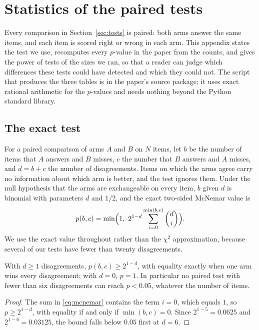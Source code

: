 \section{Statistics of the paired tests}\label{app:stats}

Every comparison in Section~\ref{sec:tests} is paired: both arms answer the same items, and each item is scored right or wrong in each arm. This appendix states the test we use, recomputes every $p$-value in the paper from the counts, and gives the power of tests of the sizes we ran, so that a reader can judge which differences these tests could have detected and which they could not. The script that produces the three tables is in the paper's source package; it uses exact rational arithmetic for the $p$-values and needs nothing beyond the Python standard library.

\subsection{The exact test}
For a paired comparison of arms $A$ and $B$ on $N$ items, let $b$ be the number of items that $A$ answers and $B$ misses, $c$ the number that $B$ answers and $A$ misses, and $d=b+c$ the number of disagreements. Items on which the arms agree carry no information about which arm is better, and the test ignores them. Under the null hypothesis that the arms are exchangeable on every item, $b$ given $d$ is binomial with parameters $d$ and $1/2$, and the exact two-sided McNemar value \cite{McNemar1947} is
\begin{equation}\label{eq:mcnemar}
p(b,c)=\min\Bigl(1,\ 2^{1-d}\sum_{i=0}^{\min(b,c)}\binom{d}{i}\Bigr).
\end{equation}
We use the exact value throughout rather than the $\chi^2$ approximation, because several of our tests have fewer than twenty disagreements.

\begin{lemma}\label{lem:mcnemar-floor}
With $d\ge1$ disagreements, $p(b,c)\ge 2^{1-d}$, with equality exactly when one arm wins every disagreement; with $d=0$, $p=1$. In particular no paired test with fewer than six disagreements can reach $p<0.05$, whatever the number of items.
\end{lemma}

\begin{proof}
The sum in \eqref{eq:mcnemar} contains the term $i=0$, which equals $1$, so $p\ge 2^{1-d}$, with equality if and only if $\min(b,c)=0$. Since $2^{1-5}=0.0625$ and $2^{1-6}=0.03125$, the bound falls below $0.05$ first at $d=6$.
\end{proof}

